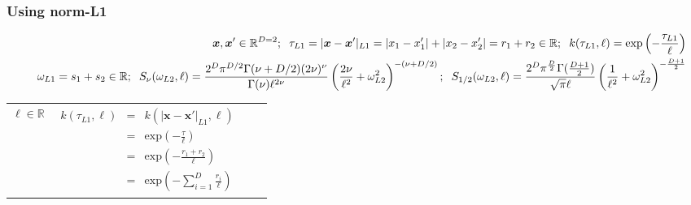 \documentclass[]{interact}
\theoremstyle{plain}%
\theoremstyle{definition}
\theoremstyle{remark}
\begin{document}
\begin{landscape}
\newpage
\subsubsection{Using norm-L1}
\vspace{-5mm}

\begin{table}[H]
\small
\begin{eqnarray*}
\vspace{-20mm}
&&\bm{x}, \bm{x}' \in \mathbb{R}^{D=2}; \hspace{2mm}\tau_{L1} =|\bm{x}-\bm{x}'|_{L1} = |x_1-x_1'|+|x_2-x_2'| = r_1+r_2 \in \mathbb{R}; \hspace{2mm} k(\tau_{L1},\ell) = \mathrm{exp}\left(- \frac{\tau_{L1}}{\ell} \right)\\
&& \omega_{L1}= s_1+s_2 \in \mathbb{R}; \hspace{2mm} S_{\nu}(\omega_{L2},\ell) = \frac{2^D\pi^{D/2}\Gamma(\nu+D/2)(2\nu)^{\nu}}{\Gamma(\nu)\ell^{2\nu}}\left(\frac{2\nu}{\ell^2}+\omega_{L2}^2 \right)^{-(\nu+D/2)}; \hspace{2mm} S_{1/2}(\omega_{L2},\ell) = \frac{2^D\pi^{\frac{D}{2}}\Gamma(\frac{D+1}{2})}{\sqrt{\pi}\ell}\left(\frac{1}{\ell^2}+\omega_{L2}^2 \right)^{-\frac{D+1}{2}}
\end{eqnarray*}
\normalsize
  \begin{center}
    \begin{tabular}{|c|c|c|c|}
       \hline
       
       \multicolumn{1}{|p{1.5cm}|}{
       \vspace{1mm}
       $\ell \in \mathbb{R}$
       }
       
        & \multicolumn{1}{|p{5.7cm}|}{\small
         \begin{eqnarray*}
		k(\tau_{L1},\ell) &=& k(|\bm{x}-\bm{x}'|_{L1},\ell)\\
		 &=& \mathrm{exp}\left(- \frac{\tau}{\ell} \right) \\
		&=& \mathrm{exp}\left(- \frac{r_1 + r_2}{\ell} \right)\\
		&=& \mathrm{exp}\left(- \sum_{i=1}^{D}\frac{r_i}{\ell} \right)
         \end{eqnarray*}
       }
       

\end{tabular}
\end{center}
\end{table}
\end{landscape}
\end{document}

